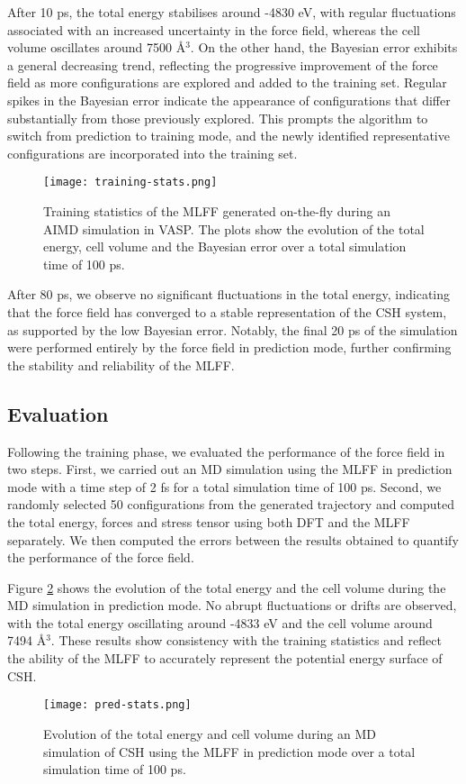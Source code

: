 After 10 ps, the total energy stabilises around -4830 eV, with regular fluctuations associated with an increased uncertainty in the force field, whereas the cell volume oscillates around 7500 \AA$^3$. On the other hand, the Bayesian error exhibits a general decreasing trend, reflecting the progressive improvement of the force field as more configurations are explored and added to the training set. Regular spikes in the Bayesian error indicate the appearance of configurations that differ substantially from those previously explored. This prompts the algorithm to switch from prediction to training mode, and the newly identified representative configurations are incorporated into the training set. 
\begin{figure}[H]
    \centering
    \texttt{[image: training-stats.png]}
    \caption{
    Training statistics of the MLFF generated on-the-fly during an AIMD simulation in VASP. The plots show the evolution of the total energy, cell volume and the Bayesian error over a total simulation time of 100 ps. 
    }
    \label{training-stats}
\end{figure}

After 80 ps, we observe no significant fluctuations in the total energy, indicating that the force field has converged to a stable representation of the CSH system, as supported by the low Bayesian error. Notably, the final 20 ps of the simulation were performed entirely by the force field in prediction mode, further confirming the stability and reliability of the MLFF.

\subsection{Evaluation}
Following the training phase, we evaluated the performance of the force field in two steps. First, we carried out an MD simulation using the MLFF in prediction mode with a time step of 2 fs for a total simulation time of 100 ps. Second, we randomly selected 50 configurations from the generated trajectory and computed the total energy, forces and stress tensor using both DFT and the MLFF separately. We then computed the errors between the results obtained to quantify the performance of the force field. 

Figure \ref{pred-stats} shows the evolution of the total energy and the cell volume during the MD simulation in prediction mode. No abrupt fluctuations or drifts are observed, with the total energy oscillating around -4833 eV and the cell volume around 7494 \AA$^3$. These results show consistency with the training statistics and reflect the ability of the MLFF to accurately represent the potential energy surface of CSH. 
\begin{figure}[h!]
    \centering
    \texttt{[image: pred-stats.png]}
    \caption{
    Evolution of the total energy and cell volume during an MD simulation of CSH using the MLFF in prediction mode over a total simulation time of 100 ps.  
    }
    \label{pred-stats}
\end{figure}

